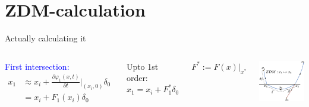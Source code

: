 \documentclass[xcolor=x11names,compress]{beamer}
\renewcommand{\(}{\begin{columns}}
\renewcommand{\)}{\end{columns}}
\newcommand{\<}[1]{\begin{column}{#1}}
\renewcommand{\>}{\end{column}}
\newcommand{\hl}[1]{\textcolor{blue}{#1}}
\begin{document}
\section{ZDM-calculation}
\begin{frame}{Actually calculating it}
\begin{columns}[c]
\hl{First intersection:}
\begin{align*}
x_1&\approx x_i+\frac{\partial \varphi_1(x,t)}{\partial t}\left.  \right|_{(x_i,0)}\delta_0\\
&= x_i+F_1(x_i)\delta_0
\end{align*}

Upto 1st order:
\begin{equation}
\label{eq-d0}
x_1=x_i+F_1^*\delta_0
\end{equation}

$F^*:=F(x)|_{x^*}$\\

\begin{center}
\includegraphics[width=\textwidth]{ZDM_eval}
\end{center}

\end{columns}
\end{frame}
\end{document}

